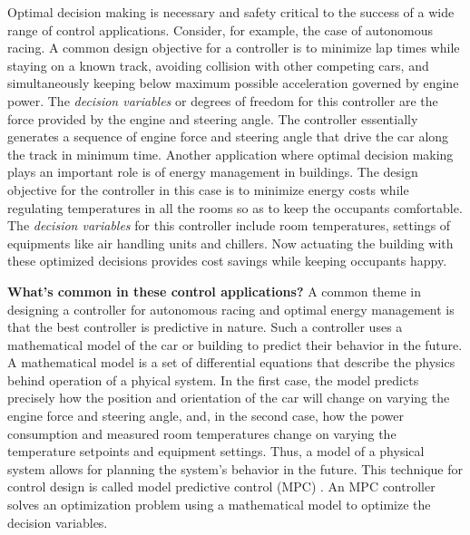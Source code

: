 Optimal decision making is necessary and safety critical to the success of a wide range of control applications. 
Consider, for example, the case of autonomous racing. 
A common design objective for a controller is to minimize lap times while staying on a known track, avoiding collision with other competing cars, and simultaneously keeping below maximum possible acceleration governed by engine power.
The \textit{decision variables} or degrees of freedom for this controller are the force provided by the engine and steering angle.
The controller essentially generates a sequence of engine force and steering angle that drive the car along the track in minimum time.
Another application where optimal decision making plays an important role is of energy management in buildings.
The design objective for the controller in this case is to minimize energy costs while regulating temperatures in all the rooms so as to keep the occupants comfortable.
The \textit{decision variables} for this controller include room temperatures, settings of equipments like air handling units and chillers.
Now actuating the building with these optimized decisions provides cost savings while keeping occupants happy.

\noindent \textbf{What's common in these control applications?}
A common theme in designing a controller for autonomous racing and optimal energy management is that the best controller is predictive in nature. 
Such a controller uses a mathematical model of the car or building to predict their behavior in the future. 
A mathematical model is a set of differential equations that describe the physics behind operation of a phyical system. 
In the first case, the model predicts precisely how the position and orientation of the car will change on varying the engine force and steering angle, and, in the second case, how the power consumption and measured room temperatures change on varying the temperature setpoints and equipment settings.
Thus, a model of a physical system allows for planning the system's behavior in the future.
This technique for control design is called model predictive control (MPC) \cite{Borrelli2017}.
An MPC controller solves an optimization problem using a mathematical model to optimize the decision variables.

